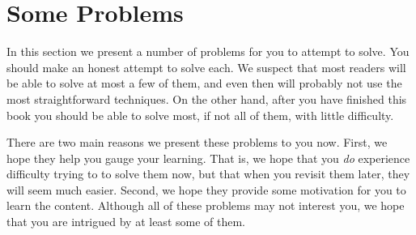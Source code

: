 \section{Some Problems}

In this section we present a number of problems for you to attempt to solve.
You should make an honest attempt to solve each.  We suspect that most readers will be
able to solve at most a few of them, and even then will probably not use the most
straightforward techniques.
On the other hand, after you have finished this book 
you should be able to solve most, if not all of them, with little difficulty.

There are two main reasons we present these problems to you now.  
First, we hope they help you gauge your learning.
That is, we hope that you {\em do} experience difficulty trying to to solve them now,
but that when you revisit them later, they will seem much easier.
Second, we hope they provide some motivation for you to learn the content.  
Although all of these problems may not interest you, 
we hope that you are intrigued by at least some of them.


